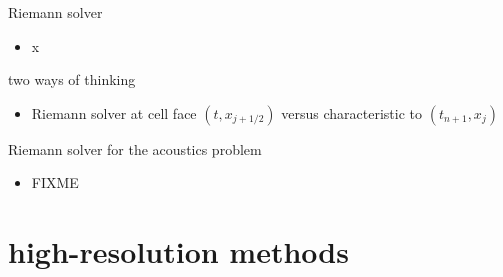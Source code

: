 \documentclass[10pt,hyperref]{beamer}
\begin{document}
\begin{frame}{Riemann solver}

\begin{itemize}
\item x
\end{itemize}
\end{frame}


\begin{frame}{two ways of thinking}

\begin{itemize}
\item Riemann solver at cell face $(t,x_{j+1/2})$ versus characteristic to $(t_{n+1},x_j)$
\end{itemize}
\end{frame}


\begin{frame}{Riemann solver for the acoustics problem}

\begin{itemize}
\item FIXME
\end{itemize}
\end{frame}


\section{high-resolution methods}
\end{document}
